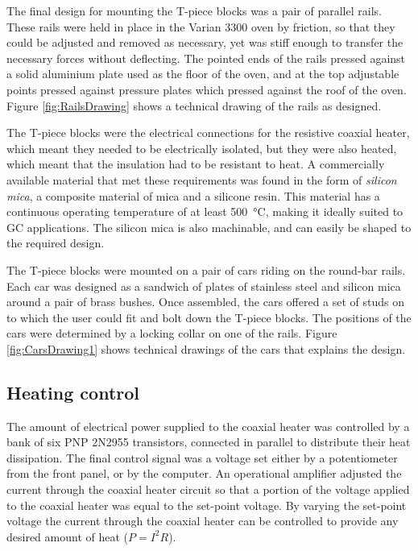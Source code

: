 The final design for mounting the T-piece blocks was a pair of parallel rails.
These rails were held in place in the Varian 3300 oven by friction, so that they
could be adjusted and removed as necessary, yet was stiff enough to transfer the
necessary forces without deflecting. The pointed ends of the rails pressed
against a solid aluminium plate used as the floor of the oven, and at the top
adjustable points pressed against pressure plates which pressed against the roof
of the oven. Figure \ref{fig:RailsDrawing} shows a technical drawing of the
rails as designed.

The T-piece blocks were the electrical connections for the resistive coaxial
heater, which meant they needed to be electrically isolated, but they were also
heated, which meant that the insulation had to be resistant to heat. A
commercially available material that met these requirements was found in the
form of \textit{silicon mica}, a composite material of mica and a silicone
resin. This material has a continuous operating temperature of at least
\SI{500}{\celsius}, making it ideally suited to GC applications. The silicon
mica is also machinable, and can easily be shaped to the required design. 

The T-piece blocks were mounted on a pair of cars riding on the round-bar rails.
Each car was designed as a sandwich of plates of stainless steel and silicon
mica around a pair of brass bushes. Once assembled, the cars offered a set of
studs on to which the user could fit and bolt down the T-piece blocks. The
positions of the cars were determined by a locking collar on one of the rails.
Figure \ref{fig:CarsDrawing1} shows technical drawings of the cars that explains
the design.


\subsection{Heating control}

The amount of electrical power supplied to the coaxial heater was controlled by
a bank of six PNP 2N2955 transistors, connected in parallel to distribute their
heat dissipation. The final control signal was a voltage set either by a
potentiometer from the front panel, or by the computer. An operational amplifier
adjusted the current through the coaxial heater circuit so that a portion of the
voltage applied to the coaxial heater was equal to the set-point voltage. By
varying the set-point voltage the current through the coaxial heater can be
controlled to provide any desired amount of heat (\(P = I^2R\)).


